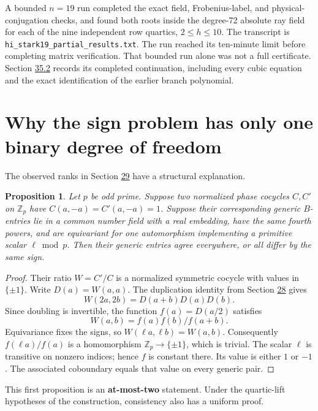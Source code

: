 \documentclass[11pt,reqno]{amsart}
\theoremstyle{plain}
\newtheorem{proposition}[theorem]{Proposition}
\begin{document}
A bounded \(n=19\) run completed the exact field, Frobenius-label,
and physical-conjugation checks, and found both roots inside the
degree-72 absolute ray field for each of the nine independent row
quartics, \(2\le h\le10\). The transcript is
\texttt{hi\_\allowbreak stark19\_\allowbreak partial\_\allowbreak results.txt}.
The run reached its ten-minute limit before completing matrix
verification. That bounded run alone was not a full certificate.
Section \hyperref[sec:35.2]{35.2} records its completed continuation, including every cubic
equation and the exact identification of the earlier branch polynomial.

\section{Why the sign problem has only one binary degree of freedom}\label{sec:30}

The observed ranks in Section \hyperref[sec:29]{29} have a structural explanation.

\begin{proposition}
Let \(p\) be odd prime. Suppose two normalized phase
cocycles \(C,C'\) on \(\mathbb Z_p\) have \(C(a,-a)=C'(a,-a)=1\).
Suppose their corresponding generic \(B\)-entries lie in a common
number field with a real embedding, have the same fourth powers, and
are equivariant for one automorphism implementing a primitive scalar
\(\ell\bmod p\). Then their generic entries agree everywhere, or all
differ by the same sign.
\end{proposition}

\begin{proof}
Their ratio \(W=C'/C\) is a normalized symmetric cocycle
with values in \(\{\pm1\}\). Write \(D(a)=W(a,a)\). The duplication
identity from Section \hyperref[sec:28]{28} gives
\[
 W(2a,2b)=D(a+b)D(a)D(b).
\]
Since doubling is invertible, the function \(f(a)=D(a/2)\) satisfies
\[
 W(a,b)=f(a)f(b)/f(a+b).
\]
Equivariance fixes the signs, so \(W(\ell a,\ell b)=W(a,b)\).
Consequently \(f(\ell a)/f(a)\) is a homomorphism
\(\mathbb Z_p\to\{\pm1\}\), which is trivial. The scalar \(\ell\)
is transitive on nonzero indices; hence \(f\) is constant there.
Its value is either \(1\) or \(-1\). The associated coboundary equals
that value on every generic pair.
\end{proof}

This first proposition is an \textbf{at-most-two} statement. Under the
quartic-lift hypotheses of the construction, consistency also has a
uniform proof.
\end{document}

